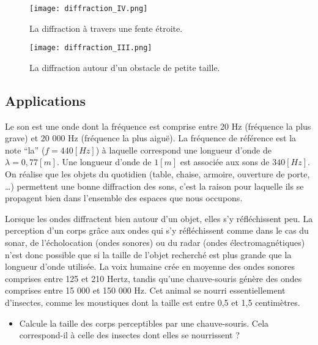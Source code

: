 \begin{figure}[ht]
    \begin{minipage}{.5\textwidth}
        \centering
        \texttt{[image: diffraction\_IV.png]}
        \caption{La diffraction à travers une fente étroite.}
        \label{fig:diffraction_IV}
    \end{minipage}
    \begin{minipage}{.5\textwidth}
        \centering
        \texttt{[image: diffraction\_III.png]}
        \caption{La diffraction autour d'un obstacle de petite taille.}
        \label{fig:diffraction_III}
    \end{minipage}
\end{figure}

\subsection{Applications}

\begin{tcolorbox}[title=Ondes acoustiques]
    Le son est une onde dont la fréquence est comprise entre 20 Hz (fréquence la plus grave) et 20 000 Hz (fréquence la plus aiguë). La fréquence de référence est la note \enquote{la} (\(f=440[Hz]\)) à laquelle correspond une longueur d'onde de \(\lambda=0,77[m]\). Une longueur d'onde de \(1 [m]\) est associée aux sons de \(340[Hz]\). On réalise que les objets du quotidien (table, chaise, armoire, ouverture de porte, \ldots) permettent une bonne diffraction des sons, c'est la raison pour laquelle ils se propagent bien dans l'ensemble des espaces que nous occupons.
\end{tcolorbox}

\begin{tcolorbox}[title=Écholocation]
    Lorsque les ondes diffractent bien autour d'un objet, elles s'y réfléchissent peu. La perception d'un corps grâce aux ondes qui s'y réfléchissent comme dans le cas du sonar, de l'écholocation (ondes sonores) ou du radar (ondes électromagnétiques) n'est donc possible que si la taille de l'objet recherché est plus grande que la longueur d'onde utilisée.
    La voix humaine crée en moyenne des ondes sonores comprises entre 125 et 210 Hertz, tandis qu'une chauve-souris génère des ondes comprises entre 15 000 et 150 000 Hz. Cet animal se nourri essentiellement d'insectes, comme les moustiques dont la taille est entre 0,5 et 1,5 centimètres.
    \begin{itemize}
        \item Calcule la taille des corps perceptibles par une chauve-souris. Cela correspond-il à celle des insectes dont elles se nourrissent ?
    \end{itemize}
\end{tcolorbox}



